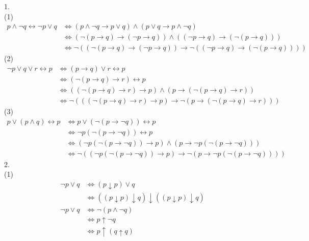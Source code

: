 \documentclass{article}
\begin{document}
1.\\
(1)
\[
\begin{aligned}
p \wedge \neg q \leftrightarrow \neg p \vee q & \iff (p \wedge \neg q \to p \vee q) \wedge (p \vee q \to p \wedge \neg q) \\
                                              & \iff (\neg (p \to q) \to (\neg p \to q)) \wedge ((\neg p \to q) \to (\neg (p \to q))) \\
                                              & \iff \neg ((\neg (p \to q) \to (\neg p \to q)) \to \neg ((\neg p \to q) \to (\neg (p \to q))))
\end{aligned}
\]
(2)
\[
\begin{aligned}
\neg p \vee q \vee r \leftrightarrow p & \iff (p \to q) \vee r \leftrightarrow p \\
                                       & \iff (\neg (p \to q) \to r) \leftrightarrow p \\
                                       & \iff ((\neg (p \to q) \to r) \to p) \wedge (p \to (\neg (p \to q) \to r)) \\
                                       & \iff \neg (((\neg (p \to q) \to r) \to p) \to \neg (p \to (\neg (p \to q) \to r)))
\end{aligned}
\]
(3)
\[
\begin{aligned}
p \vee (p \wedge q) \leftrightarrow p & \iff p \vee (\neg (p \to \neg q)) \leftrightarrow p \\
                                      & \iff \neg p (\neg (p \to \neg q)) \leftrightarrow p \\
                                      & \iff (\neg p (\neg (p \to \neg q)) \to p) \wedge (p \to \neg p (\neg (p \to \neg q))) \\
                                      & \iff \neg ((\neg p (\neg (p \to \neg q)) \to p) \to \neg (p \to \neg p (\neg (p \to \neg q))))                   
\end{aligned}    
\]
2.\\
(1)
\[
\begin{aligned}
\neg p \vee q & \iff (p \downarrow p) \vee q \\
              & \iff ((p \downarrow p) \downarrow q) \downarrow ((p \downarrow p) \downarrow q)\\
\neg p \vee q & \iff \neg (p \wedge \neg q) \\
              & \iff p \uparrow \neg q \\
              & \iff p \uparrow (q \uparrow q) 
\end{aligned}
\]
\end{document}
